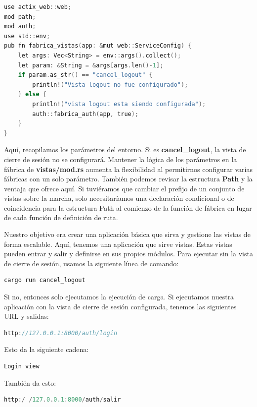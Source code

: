 \begin{lstlisting}[language=C]
use actix_web::web;
mod path;
mod auth;
use std::env;
pub fn fabrica_vistas(app: &mut web::ServiceConfig) {
	let args: Vec<String> = env::args().collect();
	let param: &String = &args[args.len()-1];
	if param.as_str() == "cancel_logout" {
		println!("Vista logout no fue configurado");
	} else {
		println!("vista logout esta siendo configurada");
		auth::fabrica_auth(app, true);
	}
}
\end{lstlisting}

Aquí, recopilamos los parámetros del entorno. Si es \textbf{cancel\_logout}, la vista de cierre de sesión no se configurará. Mantener la lógica de los parámetros en la fábrica de \textbf{vistas/mod.rs} aumenta la flexibilidad al permitirnos configurar varias fábricas con un solo parámetro. También podemos revisar la estructura \textbf{Path} y la ventaja que ofrece aquí. Si tuviéramos que cambiar el prefijo de un conjunto de vistas sobre la marcha, solo necesitaríamos una declaración condicional o de coincidencia para la estructura Path al comienzo de la función de fábrica en lugar de cada función de definición de ruta.

Nuestro objetivo era crear una aplicación básica que sirva y gestione las vistas de forma escalable. Aquí, tenemos una aplicación que sirve vistas. Estas vistas pueden entrar y salir y definirse en sus propios módulos. Para ejecutar sin la vista de cierre de sesión, usamos la siguiente línea de comando:

\begin{lstlisting}[language=C]
cargo run cancel_logout
\end{lstlisting}

Si no, entonces solo ejecutamos la ejecución de carga. Si ejecutamos nuestra aplicación con la vista de cierre de sesión configurada, tenemos las siguientes URL y salidas:


\begin{lstlisting}[language=C]
http://127.0.0.1:8000/auth/login
\end{lstlisting}

Esto da la siguiente cadena:

\begin{lstlisting}[language=C]
Login view
\end{lstlisting}

También da esto:

\begin{lstlisting}[language=C]
http:/ /127.0.0.1:8000/auth/salir
\end{lstlisting}

